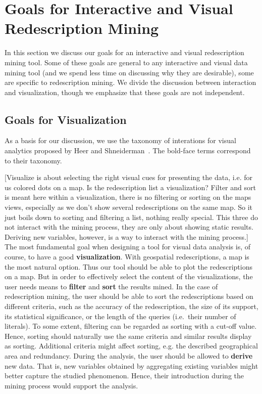 
\section{Goals for Interactive and Visual Redescription Mining}
\label{sec:goals-inter-visu}

In this section we discuss our goals for an interactive and visual
redescription mining tool. Some of these goals are general to any
interactive and visual data mining tool (and we spend less time on
discussing why they are desirable), some are specific to
redescription mining. We divide the discussion between interaction and
visualization, though we emphasize that these goals are not independent.

\subsection{Goals for Visualization}
\label{sec:goals-visualization}
As a basis for our discussion, we use the taxonomy of interations for
visual analytics proposed by Heer and
Shneiderman~\cite{Heer:2012:IDV:2133806.2133821}. The bold-face terms
correspond to their taxonomy.

[Visualize is about selecting the right visual cues for presenting the data, i.e. for us colored dots on a map.
Is the redescription list a visualization?
Filter and sort is meant here within a visualization, there is no filtering or sorting on the maps views, especially as we don't show several redescriptions on the same map.
So it just boils down to sorting and filtering a list, nothing really special.
This three do not interact with the mining process, they are only about showing static results.
Deriving new variables, however, is a way to interact with the mining process.]
The most fundamental goal when designing a tool for visual data
analysis is, of course, to have a good \textbf{visualization}. With
geospatial redescriptions, a map is the most natural option. Thus our
tool should be able to plot the redescriptions on a map. But in order
to effectively select the content of the visualizations, the user
needs means to \textbf{filter} and \textbf{sort} the results mined. In
the case of redescription mining, the user should be able to sort the
redescriptions based on different criteria, such as the accuracy of
the redescription, the size of its support, its statistical
significance, or the length of the queries (i.e.\ their number of
literals).  To some extent, filtering can be regarded as sorting with
a cut-off value. Hence, sorting should naturally use the same criteria
and similar results display as sorting. Additional criteria might
affect sorting, e.g. the described geographical area and
redundancy. During the analysis, the user should be allowed to
\textbf{derive} new data. That is, new variables obtained by
aggregating existing variables might better capture the studied
phenomenon. Hence, their introduction during the mining process would
support the analysis.

